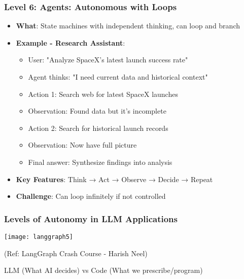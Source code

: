 \begin{frame}[fragile]\frametitle{Level 6: Agents: Autonomous with Loops}
      \begin{itemize}
        \item \textbf{What}: State machines with independent thinking, can loop and branch
        \item \textbf{Example - Research Assistant}:
        \begin{itemize}
            \item User: "Analyze SpaceX's latest launch success rate"
            \item Agent thinks: "I need current data and historical context"
            \item Action 1: Search web for latest SpaceX launches
            \item Observation: Found data but it's incomplete
            \item Action 2: Search for historical launch records
            \item Observation: Now have full picture
            \item Final answer: Synthesize findings into analysis
        \end{itemize}
        \item \textbf{Key Features}: Think → Act → Observe → Decide → Repeat
        \item \textbf{Challenge}: Can loop infinitely if not controlled
      \end{itemize}
\end{frame}

\begin{frame}[fragile]\frametitle{Levels of Autonomy in LLM Applications}
\begin{center}
\texttt{[image: langgraph5]}

{\tiny (Ref: LangGraph Crash Course - Harish Neel)}
\end{center}	  

LLM (What AI decides) vs Code (What we prescribe/program)

\end{frame}

